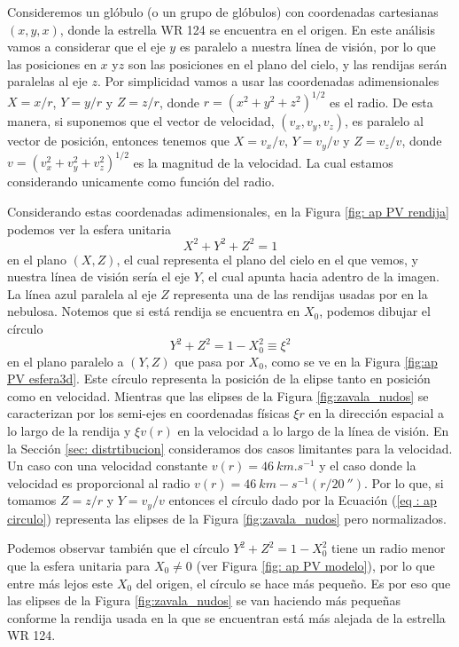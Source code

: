\documentclass{book}
\begin{document}
Consideremos un glóbulo (o un grupo de glóbulos) con coordenadas
cartesianas $(x,y,x)$, donde la estrella WR 124 se encuentra en el
origen. En este análisis vamos a considerar que el eje $y$ es paralelo
a nuestra línea de visión, por lo que las posiciones en $x$ y$z$ son
las posiciones en el plano del cielo, y las rendijas serán paralelas
al eje $z$. Por simplicidad vamos a usar las coordenadas
adimensionales $X=x/r$, $Y=y/r$ y $Z=z/r$, donde
$r = \left( x^2+y^2+z^2\right)^{1/2}$ es el radio. De esta manera, si
suponemos que el vector de velocidad, $(v_x,v_y,v_z)$, es paralelo al
vector de posición, entonces tenemos que $X=v_x/v$, $Y=v_y/v$ y
$Z=v_z/v$, donde $v = \left( v_x^2+v_y^2+v_z^2\right)^{1/2}$ es la
magnitud de la velocidad. La cual estamos considerando unicamente como
función del radio.

Considerando estas coordenadas adimensionales, en la Figura \ref{fig:
  ap PV rendija} podemos ver la esfera unitaria
\begin{equation}
X^2+Y^2+Z^2=1
\end{equation}
en el plano $(X,Z)$, el cual representa el plano del cielo en el que
vemos, y nuestra línea de visión sería el eje $Y$, el cual apunta
hacia adentro de la imagen. La línea azul paralela al eje $Z$
representa una de las rendijas usadas por \cite{Zavala:2022} en la
nebulosa. Notemos que si está rendija se encuentra en $X_0$, podemos
dibujar el círculo
\begin{equation}\label{eq : ap circulo}
 Y^2+Z^2=1-X_0^2 \equiv \xi^2
\end{equation}
en el plano paralelo a $(Y,Z)$ que pasa por $X_0$, como se ve en la
Figura \ref{fig:ap PV esfera3d}. Este círculo representa la posición
de la elipse tanto en posición como en velocidad. Mientras que las
elipses de la Figura \ref{fig:zavala_nudos} se caracterizan por los
semi-ejes en coordenadas físicas $\xi r$ en la dirección espacial a lo
largo de la rendija y $\xi v(r)$ en la velocidad a lo largo de la línea
de visión. En la Sección \ref{sec: distrtibucion} consideramos dos
casos limitantes para la velocidad. Un caso con una velocidad
constante $v(r)=\SI{46}{km.s^{-1}}$ y el caso donde la velocidad es
proporcional al radio
$v(r)=\SI{46}{km-s^{-1}}(r/\SI{20}{\arcsecond})$. Por lo que, si
tomamos $Z=z/r$ y $Y=v_y/v$ entonces el círculo dado por la Ecuación
(\ref{eq : ap circulo}) representa las elipses de la Figura
\ref{fig:zavala_nudos} pero normalizados.

Podemos observar también que el círculo $Y^2+Z^2=1-X_0^2$ tiene un
radio menor que la esfera unitaria para $X_0\neq0$ (ver Figura \ref{fig:
  ap PV modelo}), por lo que entre más lejos este $X_0$ del origen, el
círculo se hace más pequeño. Es por eso que las elipses de la Figura
\ref{fig:zavala_nudos} se van haciendo más pequeñas conforme la
rendija usada en la que se encuentran está más alejada de la estrella
WR 124.
\end{document}
